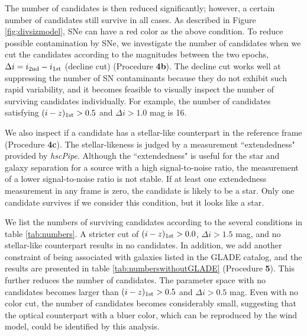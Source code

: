 \documentclass[]{pasj01}
\begin{document}
The number of candidates is then reduced significantly; however, a certain number of candidates still survive in all cases.
As described in Figure \ref{fig:divsizmodel}, SNe can have a red color as the above condition.
To reduce possible contamination by SNe, we investigate
the number of candidates when we cut the candidates according to the magnitudes between the two epochs, $\Delta i = i_{\rm 2nd} - i_{\rm 1st}$ (decline cut)  (Procedure {\bf 4b}).
The decline cut works well at suppressing the number of SN contaminants
because they do not exhibit such rapid variability,  and it becomes feasible  to visually  inspect 
the number of surviving candidates individually.
For example, the number of candidates satisfying $(i-z)_{\rm 1st}>0.5$ and $\Delta i>1.0$ mag is 16.

We also inspect if a candidate has a stellar-like counterpart in the reference frame (Procedure {\bf 4c}).
The stellar-likeness is judged by a measurement ``extendedness" provided by \emph{hscPipe}.
Although the ``extendedness"  is useful for the star and galaxy separation for a source with a high signal-to-noise ratio,
the measurement of a lower signal-to-noise ratio is not stable.
If at least  one extendedness measurement in any frame is zero,
the candidate is likely to be a star.
Only one candidate survives if we consider this condition, but it looks like a star.

We list the numbers of surviving candidates according to the several conditions in table \ref{tab:numbers}.
A stricter cut of $(i-z)_{\rm 1st}>0.0$, $\Delta i>1.5$ mag, and no stellar-like counterpart results in no candidates. 
In addition, we add another constraint of being associated with galaxies listed in the GLADE catalog,
and the results are presented in table \ref{tab:numberswithoutGLADE} (Procedure {\bf 5}).
This further reduces the number of candidates. 
The parameter space with no candidates becomes larger than $(i-z)_{\rm 1st}>0.5$ and $\Delta i>0.5$ mag.
Even with no color cut, the number of candidates becomes considerably small,
suggesting that the optical counterpart with a bluer color, which can be reproduced by the wind model, could be identified by this analysis.

\end{document}
